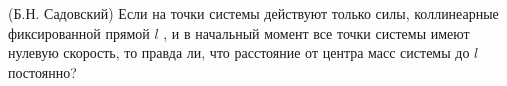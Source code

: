 (Б.Н. Садовский)
Если на точки системы действуют только силы, коллинеарные фиксированной
прямой $l$ , и в начальный момент все точки системы имеют нулевую
скорость, то правда ли, что расстояние от центра масс системы до $l$
постоянно?
